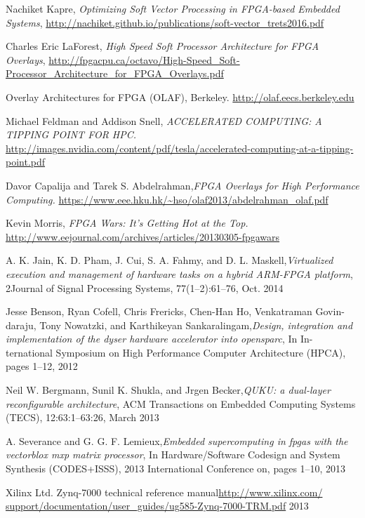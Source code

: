 
\begin{thebibliography}{1}

Nachiket Kapre, \emph{Optimizing Soft Vector Processing in FPGA-based Embedded
	Systems}, \url{http://nachiket.github.io/publications/soft-vector_trets2016.pdf}

Charles Eric LaForest, \emph{High Speed Soft Processor Architecture for FPGA Overlays}, \url{http://fpgacpu.ca/octavo/High-Speed_Soft-Processor_Architecture_for_FPGA_Overlays.pdf}

Overlay Architectures for FPGA (OLAF), Berkeley. \url{http://olaf.eecs.berkeley.edu}

Michael Feldman and Addison Snell, \emph{ACCELERATED COMPUTING: A TIPPING POINT FOR HPC.}
\url{http://images.nvidia.com/content/pdf/tesla/accelerated-computing-at-a-tipping-point.pdf}

Davor Capalija and Tarek S. Abdelrahman,\emph{FPGA Overlays for High Performance Computing.} \url{https://www.eee.hku.hk/~hso/olaf2013/abdelrahman_olaf.pdf}

Kevin Morris, \emph{FPGA Wars: It’s Getting Hot at the Top.}
\url{http://www.eejournal.com/archives/articles/20130305-fpgawars}

A. K. Jain, K. D. Pham, J. Cui, S. A. Fahmy, and D. L. Maskell,\emph{Virtualized
	execution and management of hardware tasks on a hybrid ARM-FPGA platform}, 2Journal of Signal Processing Systems, 77(1–2):61–76, Oct. 2014

Jesse Benson, Ryan Cofell, Chris Frericks, Chen-Han Ho, Venkatraman Govin-
daraju, Tony Nowatzki, and Karthikeyan Sankaralingam,\emph{Design, integration
	and implementation of the dyser hardware accelerator into opensparc}, In In-
ternational Symposium on High Performance Computer Architecture (HPCA),
pages 1–12, 2012

Neil W. Bergmann, Sunil K. Shukla, and Jrgen Becker,\emph{QUKU: a dual-layer
	reconfigurable architecture}, ACM Transactions on Embedded Computing Systems
(TECS), 12:63:1–63:26, March 2013

A. Severance and G. G. F. Lemieux,\emph{Embedded supercomputing in fpgas with the
	vectorblox mxp matrix processor}, In Hardware/Software Codesign and System
Synthesis (CODES+ISSS), 2013 International Conference on, pages 1–10, 2013

Xilinx Ltd. Zynq-7000 technical reference manual\url{http://www.xilinx.com/
	support/documentation/user_guides/ug585-Zynq-7000-TRM.pdf} 2013


\end{thebibliography}
